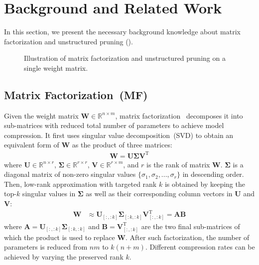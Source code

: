 \section{Background and Related Work}
In this section, we present the necessary background knowledge about matrix factorization and unstructured pruning ().

\begin{figure}[t!]
	\centering
	\caption{Illustration of matrix factorization and unstructured pruning  on a single weight matrix.}
	\label{fig:intro}
\end{figure}

\subsection{Matrix Factorization~(MF)}
\label{sec:lr}
Given the weight matrix $\bm{W}\in \mathbb{R}^{n\times m}$, matrix factorization~\cite{svd} decomposes it into sub-matrices with reduced total number of parameters to achieve model compression.  
It first uses singular value decomposition~(SVD) to obtain an equivalent 
form of $\bm{W}$ as the product of three matrices:
\begin{align}
	\bm{W}=\bm{U}\bm{\Sigma}\bm{V}^\mathrm{T}
\end{align}
where $\bm{U}\in \mathbb{R}^{n\times r}$, $\bm{\Sigma}\in  \mathbb{R}^{r\times r}$, $\bm{V}\in \mathbb{R}^{r\times m}$, and $r$ is the rank of matrix $\bm{W}$. $\bm{\Sigma}$ is a diagonal matrix of non-zero singular values $\{\sigma_1, \sigma_2,...,\sigma_r\}$ in descending order. Then, low-rank approximation with targeted rank $k$ is obtained by keeping the top-$k$ singular values in $\bm{\Sigma}$ as well as their corresponding column vectors in $\bm{U}$ and $\bm{V}$:
\begin{align}
	\bm{W}&\approx \bm{U}_{[:, :k]}\bm{\Sigma}_{[:k,:k]}\bm{V}_{[:, :k]}^{\mathrm{T}} =\bm{A}\bm{B}
	\label{eq:svd}
\end{align}
where $\bm{A}=\bm{U}_{[:,:k]}\bm{\Sigma}_{[:k,:k]}$ and $\bm{B}=\bm{V}_{[:,:k]}^{\mathrm{T}}$ are the two final sub-matrices of which the product is used to replace $\bm{W}$. After such factorization, the number of parameters is reduced from $nm$ to $k(n+m)$. Different compression rates can be achieved by varying the preserved rank $k$.



